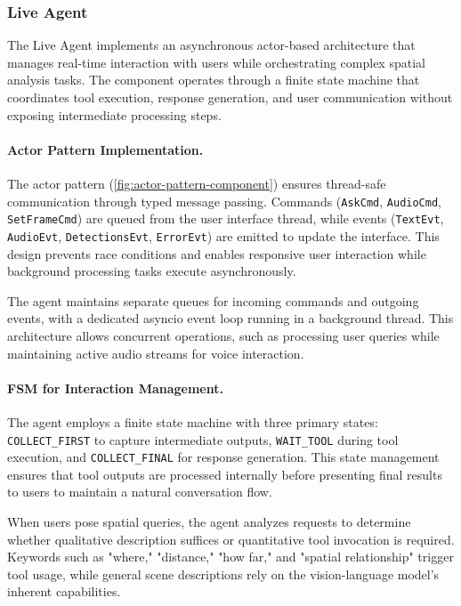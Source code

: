 \subsubsection{Live Agent}

The Live Agent implements an asynchronous actor-based architecture that manages real-time interaction with users while orchestrating complex spatial analysis tasks. The component operates through a finite state machine that coordinates tool execution, response generation, and user communication without exposing intermediate processing steps.

\paragraph{Actor Pattern Implementation.}

The actor pattern (\autoref{fig:actor-pattern-component}) ensures thread-safe communication through typed message passing. Commands (\texttt{AskCmd}, \texttt{AudioCmd}, \texttt{SetFrameCmd}) are queued from the user interface thread, while events (\texttt{TextEvt}, \texttt{AudioEvt}, \texttt{DetectionsEvt}, \texttt{ErrorEvt}) are emitted to update the interface. This design prevents race conditions and enables responsive user interaction while background processing tasks execute asynchronously.

The agent maintains separate queues for incoming commands and outgoing events, with a dedicated asyncio event loop running in a background thread. This architecture allows concurrent operations, such as processing user queries while maintaining active audio streams for voice interaction.

\paragraph{FSM for Interaction Management.}

The agent employs a finite state machine with three primary states: \texttt{COLLECT\_FIRST} to capture intermediate outputs, \texttt{WAIT\_TOOL} during tool execution, and \texttt{COLLECT\_FINAL} for response generation. This state management ensures that tool outputs are processed internally before presenting final results to users to maintain a natural conversation flow.

When users pose spatial queries, the agent analyzes requests to determine whether qualitative description suffices or quantitative tool invocation is required. Keywords such as "where," "distance," "how far," and "spatial relationship" trigger tool usage, while general scene descriptions rely on the vision-language model's inherent capabilities.

